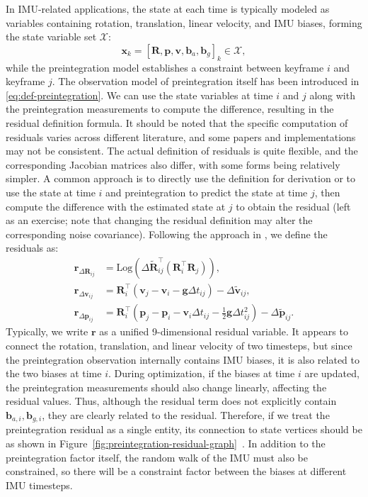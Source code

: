 In IMU-related applications, the state at each time is typically modeled as variables containing rotation, translation, linear velocity, and IMU biases, forming the state variable set $\mathcal{X}$:
\begin{equation}\label{key}
	\bm{x}_k = \left[ \bm{R}, \bm{p}, \bm{v}, \bm{b}_a, \bm{b}_g \right]_k \in \mathcal{X},
\end{equation}
while the preintegration model establishes a constraint between keyframe $i$ and keyframe $j$. The observation model of preintegration itself has been introduced in \eqref{eq:def-preintegration}. We can use the state variables at time $i$ and $j$ along with the preintegration measurements to compute the difference, resulting in the residual definition formula. It should be noted that the specific computation of residuals varies across different literature, and some papers and implementations may not be consistent. The actual definition of residuals is quite flexible, and the corresponding Jacobian matrices also differ, with some forms being relatively simpler. A common approach is to directly use the definition for derivation or to use the state at time $i$ and preintegration to predict the state at time $j$, then compute the difference with the estimated state at $j$ to obtain the residual (left as an exercise; note that changing the residual definition may alter the corresponding noise covariance). Following the approach in \cite{Forster2015}, we define the residuals as:
\begin{subequations}
	\label{eq:def-of-preintegration-residuals}
	\begin{align}
		\bm{r}_{\Delta \bm{R}_{ij}} &= \mathrm{Log} \left(\Delta \tilde{\bm{R}}_{ij}^\top 
		\left(\bm{R}_i^\top \bm{R}_j \right)\right), \\
		\bm{r}_{\Delta \bm{v}_{ij}} &= \bm{R}_i^\top \left(\bm{v}_j - \bm{v}_i - \bm{g} \Delta t_{ij} \right) - \Delta 
		\tilde{\bm{v}}_{ij}, \\
		\bm{r}_{\Delta \bm{p}_{ij}} &= \bm{R}_i^\top \left(\bm{p}_j - \bm{p}_i - \bm{v}_i \Delta t_{ij} - 
		\frac{1}{2}\bm{g} \Delta t_{ij}^2 \right) - \Delta \tilde{\bm{p}}_{ij}.
	\end{align}
\end{subequations}
Typically, we write $\bm{r}$ as a unified 9-dimensional residual variable. It appears to connect the rotation, translation, and linear velocity of two timesteps, but since the preintegration observation internally contains IMU biases, it is also related to the two biases at time $i$. During optimization, if the biases at time $i$ are updated, the preintegration measurements should also change linearly, affecting the residual values. Thus, although the residual term does not explicitly contain $\bm{b}_{a,i}, \bm{b}_{g,i}$, they are clearly related to the residual. Therefore, if we treat the preintegration residual as a single entity, its connection to state vertices should be as shown in Figure~\ref{fig:preintegration-residual-graph}~. In addition to the preintegration factor itself, the random walk of the IMU must also be constrained, so there will be a constraint factor between the biases at different IMU timesteps.

